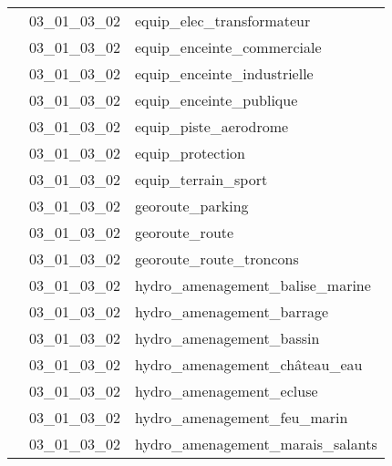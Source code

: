 \documentclass[12pt,titlepage]{book}
\begin{document}
\begin{supertabular}{|p{10cm}|c|p{15cm}|}
                    & 03\_01\_03\_02 & equip\_elec\_transformateur\\


                    & 03\_01\_03\_02 & equip\_enceinte\_commerciale\\


                    & 03\_01\_03\_02 & equip\_enceinte\_industrielle\\


                    & 03\_01\_03\_02 & equip\_enceinte\_publique\\


                    & 03\_01\_03\_02 & equip\_piste\_aerodrome\\


                    & 03\_01\_03\_02 & equip\_protection\\


                    & 03\_01\_03\_02 & equip\_terrain\_sport\\


                    & 03\_01\_03\_02 & georoute\_parking\\


                    & 03\_01\_03\_02 & georoute\_route\\


                    & 03\_01\_03\_02 & georoute\_route\_troncons\\


                    & 03\_01\_03\_02 & hydro\_amenagement\_balise\_marine\\


                    & 03\_01\_03\_02 & hydro\_amenagement\_barrage\\


                    & 03\_01\_03\_02 & hydro\_amenagement\_bassin\\


                    & 03\_01\_03\_02 & hydro\_amenagement\_château\_eau\\


                    & 03\_01\_03\_02 & hydro\_amenagement\_ecluse\\


                    & 03\_01\_03\_02 & hydro\_amenagement\_feu\_marin\\


                    & 03\_01\_03\_02 & hydro\_amenagement\_marais\_salants\\



\end{supertabular}
\end{document}
